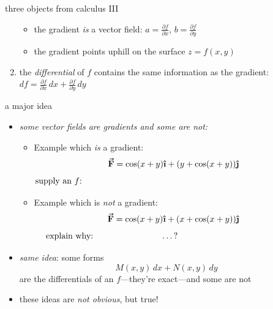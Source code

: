 \documentclass{beamer}
\newcommand{\ih}{\boldsymbol{\hat{\textbf{\i}}}}
\newcommand{\jh}{\boldsymbol{\hat{\textbf{\j}}}}
\newcommand{\vF}{\boldsymbol{\vec{\textbf{F}}}}
\begin{document}
\begin{frame}{three objects from calculus III}
\begin{enumerate}
    \vspace{-2mm}
    \begin{itemize}
    \item the gradient \emph{is} a vector field:  $a=\frac{\partial f}{\partial x}$, $b=\frac{\partial f}{\partial y}$
    \item the gradient points uphill on the surface $z=f(x,y)$
    \end{itemize}
\item the \emph{differential} of $f$ contains the same information as the gradient: $df = \frac{\partial f}{\partial x}\,dx + \frac{\partial f}{\partial y}\,dy$
\end{enumerate}
\end{frame}


\begin{frame}{a major idea}

\begin{itemize}
\item \emph{some vector fields are gradients and some are not:}

\medskip
    \begin{itemize}
    \item Example which \emph{is} a gradient:
        $$\vF=\cos(x+y)\ih + (y+\cos(x+y))\jh$$
        $$\text{supply an $f$:} \hspace{4.0in}$$

\medskip
    \item Example which is \emph{not} a gradient:
        $$\vF=\cos(x+y)\ih + (x+\cos(x+y))\jh$$
        $$\text{explain why: \hspace{1.0in} \dots ?} \hspace{2.0in}$$
    \end{itemize}
\item \emph{same idea}: some forms
    $$M(x,y)\,dx + N(x,y)\,dy$$
are the differentials of an $f$---they're \alert{exact}---and some are not
\item these ideas are \emph{not obvious}, but true!
\end{itemize}
\end{frame}
\end{document}
